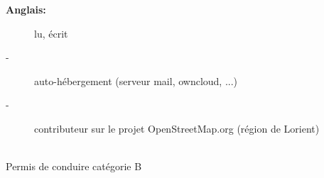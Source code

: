 \documentclass[11pt, oneside, a4paper, french]{article}
\begin{document}
\begin{description}
  \item[\textbf{Anglais:}] lu, \'ecrit
\end{description} 

\vspace{1cm}

\textbf{
  \Large{
  }
}

\begin{description}
    \item[-] auto-h\'ebergement (serveur mail, owncloud, ...)
    \item[-] contributeur sur le projet OpenStreetMap.org (r\'egion de Lorient)
\end{description}

\vspace{1cm}

\textbf{
  \Large{
  }
}\\

\noindent
Permis de conduire cat\'egorie B
\end{document}
